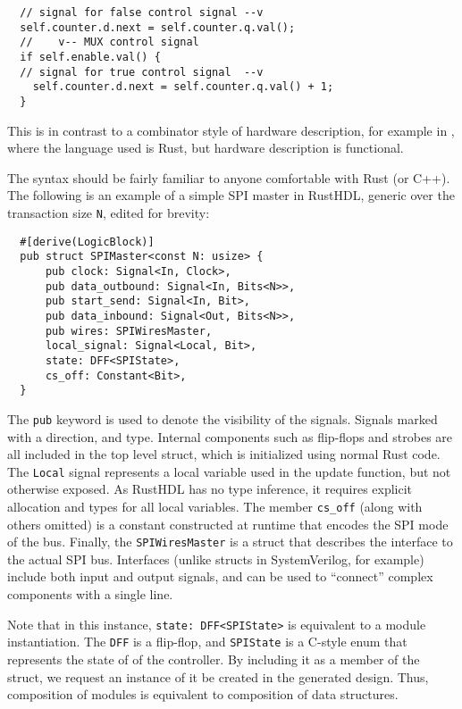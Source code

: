 \documentclass[sigplan,screen,sigconf]{acmart}
\begin{document}
\begin{verbatim}
  // signal for false control signal --v
  self.counter.d.next = self.counter.q.val();
  //    v-- MUX control signal
  if self.enable.val() {
  // signal for true control signal  --v
    self.counter.d.next = self.counter.q.val() + 1;
  }
\end{verbatim}

This is in contrast to a combinator style of hardware description, for example in \cite{b4b}, where the 
language used is Rust, but hardware description is functional.

The syntax should be fairly familiar to anyone comfortable with Rust (or C++).  The 
following is an example of a simple SPI master in RustHDL, generic over the transaction size \verb|N|, edited for brevity:

\begin{verbatim}
  #[derive(LogicBlock)]
  pub struct SPIMaster<const N: usize> {
      pub clock: Signal<In, Clock>,
      pub data_outbound: Signal<In, Bits<N>>,
      pub start_send: Signal<In, Bit>,
      pub data_inbound: Signal<Out, Bits<N>>,
      pub wires: SPIWiresMaster,
      local_signal: Signal<Local, Bit>,
      state: DFF<SPIState>,
      cs_off: Constant<Bit>,
  }
\end{verbatim}  

The \verb|pub| keyword is used to denote the visibility of the signals.  Signals 
marked with a direction, and type.  Internal components such as flip-flops and strobes
are all included in the top level struct, which is initialized using normal Rust code.
The \verb|Local| signal represents a local variable used in the update function, but
not otherwise exposed.  As RustHDL has no type inference, it requires explicit allocation
and types for all local variables.  The member \verb|cs_off| (along with others omitted) 
is a constant constructed at runtime that encodes the SPI mode of the bus.  Finally, 
the \verb|SPIWiresMaster| is a struct that describes the interface to the actual SPI bus.
Interfaces (unlike structs in SystemVerilog, for example) include both input and output
signals, and can be used to ``connect'' complex components with a single line.  

Note that in this instance, \verb|state: DFF<SPIState>| is equivalent to a module 
instantiation.  The \verb|DFF| is a flip-flop, and \verb|SPIState| is a C-style enum 
that represents the state of of the controller.  By including it as a member of the 
struct, we request an instance of it be created in the generated design.  Thus, composition of 
modules is equivalent to composition of data structures.
\end{document}
